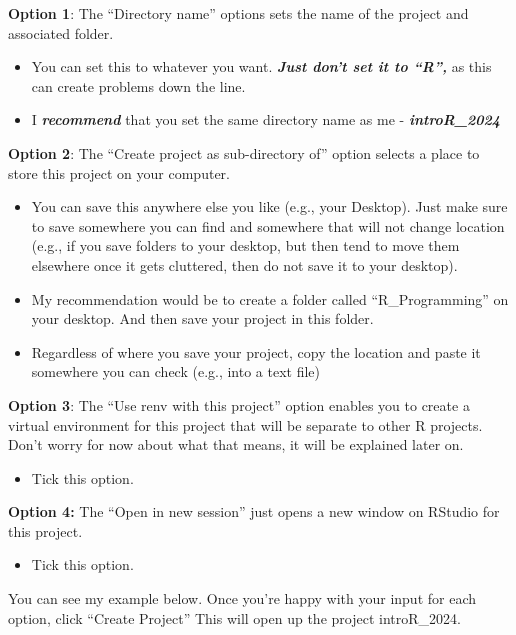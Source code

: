 \documentclass[
]{book}
\providecommand{\tightlist}{%
  \setlength{\itemsep}{0pt}\setlength{\parskip}{0pt}}
\begin{document}
\textbf{Option 1}: The ``Directory name'' options sets the name of the project and associated folder.

\begin{itemize}
\item
  You can set this to whatever you want. \textbf{\emph{Just don't set it to ``R'',}} as this can create problems down the line.
\item
  I \textbf{\emph{recommend}} that you set the same directory name as me - \textbf{\emph{introR\_2024}}
\end{itemize}

\textbf{Option 2}: The ``Create project as sub-directory of'' option selects a place to store this project on your computer.

\begin{itemize}
\item
  You can save this anywhere else you like (e.g., your Desktop). Just make sure to save somewhere you can find and somewhere that will not change location (e.g., if you save folders to your desktop, but then tend to move them elsewhere once it gets cluttered, then do not save it to your desktop).
\item
  My recommendation would be to create a folder called ``R\_Programming'' on your desktop. And then save your project in this folder.
\item
  Regardless of where you save your project, copy the location and paste it somewhere you can check (e.g., into a text file)
\end{itemize}

\textbf{Option 3}: The ``Use renv with this project'' option enables you to create a virtual environment for this project that will be separate to other R projects. Don't worry for now about what that means, it will be explained later on.

\begin{itemize}
\tightlist
\item
  Tick this option.
\end{itemize}

\textbf{Option 4:} The ``Open in new session'' just opens a new window on RStudio for this project.

\begin{itemize}
\tightlist
\item
  Tick this option.
\end{itemize}

You can see my example below. Once you're happy with your input for each option, click ``Create Project'' This will open up the project introR\_2024.
\end{document}
